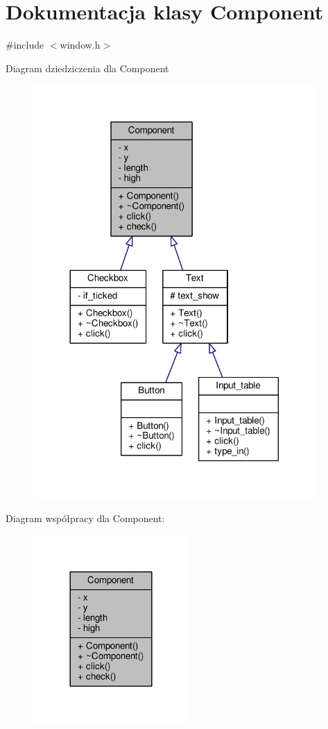 \hypertarget{classComponent}{}\section{Dokumentacja klasy Component}
\label{classComponent}


{\ttfamily \#include $<$window.\+h$>$}



Diagram dziedziczenia dla Component
\nopagebreak
\begin{figure}[H]
\begin{center}
\leavevmode
\includegraphics[width=305pt]{classComponent__inherit__graph}
\end{center}
\end{figure}


Diagram współpracy dla Component\+:\nopagebreak
\begin{figure}[H]
\begin{center}
\leavevmode
\includegraphics[width=168pt]{classComponent__coll__graph}
\end{center}
\end{figure}
